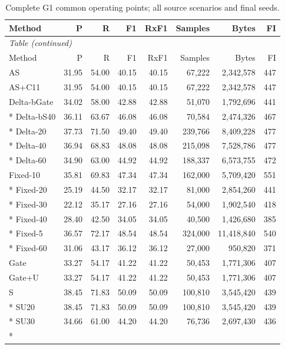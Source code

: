 \begin{small}\setlength{\tabcolsep}{3pt}\begin{longtable}{lrrrrrrr}
\caption{Complete G1 common operating points; all source scenarios and final seeds.}\label{tab:commoncomplete}\\
\toprule Method & P & R & F1 & RxF1 & Samples & Bytes & FI \\\midrule\endfirsthead\multicolumn{8}{l}{\textit{Table \thetable{} (continued)}}\\\toprule Method & P & R & F1 & RxF1 & Samples & Bytes & FI \\\midrule\endhead
AS & 31.95 & 54.00 & 40.15 & 40.15 & 67,222 & 2,342,578 & 447 \\
AS+C11 & 31.95 & 54.00 & 40.15 & 40.15 & 67,222 & 2,342,578 & 447 \\
Delta-bGate & 34.02 & 58.00 & 42.88 & 42.88 & 51,070 & 1,792,696 & 441 \\*
Delta-bS40 & 36.11 & 63.67 & 46.08 & 46.08 & 70,584 & 2,474,326 & 467 \\*
Delta-20 & 37.73 & 71.50 & 49.40 & 49.40 & 239,766 & 8,409,228 & 477 \\*
Delta-40 & 36.94 & 68.83 & 48.08 & 48.08 & 215,098 & 7,528,786 & 477 \\*
Delta-60 & 34.90 & 63.00 & 44.92 & 44.92 & 188,337 & 6,573,755 & 472 \\
Fixed-10 & 35.81 & 69.83 & 47.34 & 47.34 & 162,000 & 5,709,420 & 551 \\*
Fixed-20 & 25.19 & 44.50 & 32.17 & 32.17 & 81,000 & 2,854,260 & 441 \\*
Fixed-30 & 22.12 & 35.17 & 27.16 & 27.16 & 54,000 & 1,902,540 & 418 \\*
Fixed-40 & 28.40 & 42.50 & 34.05 & 34.05 & 40,500 & 1,426,680 & 385 \\*
Fixed-5 & 36.57 & 72.17 & 48.54 & 48.54 & 324,000 & 11,418,840 & 540 \\*
Fixed-60 & 31.06 & 43.17 & 36.12 & 36.12 & 27,000 & 950,820 & 371 \\
Gate & 33.27 & 54.17 & 41.22 & 41.22 & 50,453 & 1,771,306 & 407 \\
Gate+U & 33.27 & 54.17 & 41.22 & 41.22 & 50,453 & 1,771,306 & 407 \\
S & 38.45 & 71.83 & 50.09 & 50.09 & 100,810 & 3,545,420 & 439 \\*
SU20 & 38.45 & 71.83 & 50.09 & 50.09 & 100,810 & 3,545,420 & 439 \\*
SU30 & 34.66 & 61.00 & 44.20 & 44.20 & 76,736 & 2,697,430 & 436 \\*

\end{longtable}
\end{small}
